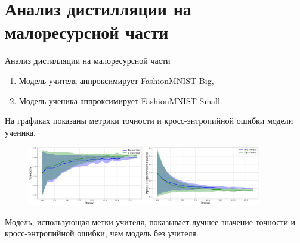 \documentclass[10pt,pdf,hyperref={unicode}]{beamer}
\begin{document}
\section{Анализ дистилляции на малоресурсной части}
\begin{frame}{Анализ дистилляции на малоресурсной части}
\justifying
\begin{enumerate}[1)]
    \item Модель учителя аппроксимирует FashionMNIST-Big,
    \item Модель ученика аппроксимирует FashionMNIST-Small.
\end{enumerate}

На графиках показаны метрики точности и кросс-энтропийной ошибки модели ученика.

\begin{figure}[h!]
\includegraphics[width=0.45\textwidth]{results/small_acc.png}
\includegraphics[width=0.45\textwidth]{results/small_loss.png}
\end{figure}

Модель, использующая метки учителя, показывает лучшее значение точности и кросс-энтропийной ошибки, чем модель без учителя.

\end{frame}

\end{document}
